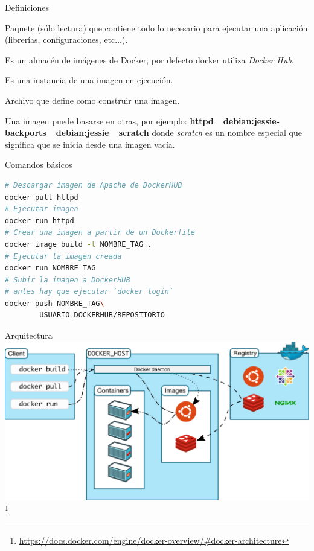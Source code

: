 \begin{frame}{Definiciones}
    \begin{description}[<+->]
        \item[imagen:] Paquete (sólo lectura) que contiene todo lo necesario
            para ejecutar una aplicación (librerías, configuraciones, etc...).
        \item[registry:] Es un almacén de imágenes de Docker, por defecto
            docker utiliza \textit{Docker Hub}.
        \item[container:] Es una instancia de una imagen en ejecución.
        \item[Dockerfile:] Archivo que define como construir una imagen.
    \end{description}
    Una imagen puede basarse en otras, por ejemplo:
    \textbf{httpd~\textrightarrow~debian:jessie-backports~\textrightarrow~debian:jessie~\textrightarrow~scratch}
    donde \textit{scratch} es un nombre especial que significa
    que se inicia desde una imagen vacía.
\end{frame}

\begin{frame}[fragile]{Comandos básicos}
    \begin{lstlisting}[language=bash,basicstyle=\normalsize]
# Descargar imagen de Apache de DockerHUB
docker pull httpd
# Ejecutar imagen
docker run httpd
# Crear una imagen a partir de un Dockerfile
docker image build -t NOMBRE_TAG .
# Ejecutar la imagen creada
docker run NOMBRE_TAG
# Subir la imagen a DockerHUB
# antes hay que ejecutar `docker login`
docker push NOMBRE_TAG\
        USUARIO_DOCKERHUB/REPOSITORIO
    \end{lstlisting}
\end{frame}

\begin{frame}{Arquitectura}
    \includegraphics[width=\linewidth]{imagenes/architecture}
    \footnote{\url{https://docs.docker.com/engine/docker-overview/\#docker-architecture}}
\end{frame}

